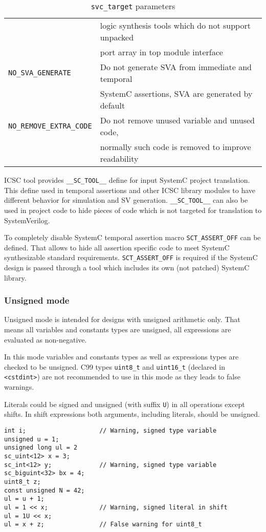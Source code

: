 \begin{table}
\begin{tabular}{|l|l|}
                & logic synthesis tools which do not support unpacked \\
                & port array in top module interface \\
{\tt NO\_SVA\_GENERATE} & Do not generate SVA from immediate and temporal \\ 
                & SystemC assertions, SVA are generated by default \\
{\tt NO\_REMOVE\_EXTRA\_CODE} & Do not remove unused variable and unused code, \\ 
                & normally such code is removed to improve readability \\
\hline
\end{tabular}
\caption{{\tt svc\_target} parameters}
\label{tab:tool_opts}
\end{table}

ICSC tool provides {\tt \_\_SC\_TOOL\_\_} define for input SystemC project translation. This define used in temporal assertions and other ICSC library modules to have different behavior for simulation and SV generation. {\tt \_\_SC\_TOOL\_\_} can also be used in project code to hide pieces of code which is not targeted for translation to SystemVerilog.

To completely disable SystemC temporal assertion macro {\tt SCT\_ASSERT\_OFF} can be defined. That allows to hide all assertion specific code to meet SystemC synthesizable standard requirements. {\tt SCT\_ASSERT\_OFF} is required if the SystemC design is passed through a tool which includes its own (not patched) SystemC library.

\subsubsection{Unsigned mode}\label{section:unsigned_mode}

Unsigned mode is intended for designs with unsigned arithmetic only. That means all variables and constants types are unsigned, all expressions are evaluated as non-negative.

In this mode variables and constants types as well as expressions types are checked to be unsigned. C99 types {\tt uint8\_t} and {\tt uint16\_t} (declared in {\tt <cstdint>}) are not recommended to use in this mode as they leads to false warnings. 

Literals could be signed and unsigned (with suffix {\tt U}) in all operations except shifts. In shift expressions both arguments, including literals, should be unsigned.

\begin{lstlisting}[style=mycpp]
int i;                    // Warning, signed type variable  
unsigned u = 1;     
unsigned long ul = 2
sc_uint<12> x = 3;
sc_int<12> y;             // Warning, signed type variable 
sc_biguint<32> bx = 4;
uint8_t z;                
const unsigned N = 42;
ul = u + 1; 
ul = 1 << x;              // Warning, signed literal in shift 
ul = 1U << x;           
ul = x + z;               // False warning for uint8_t
\end{lstlisting}
